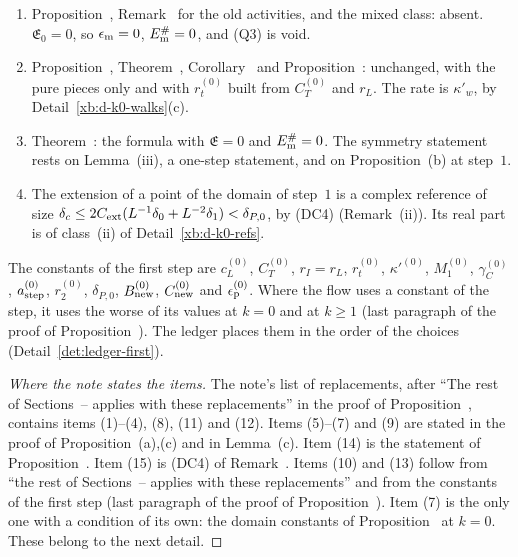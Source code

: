 \begin{detail}[Proposition~\Nref{prop:first-step}: the adaptations at $k=0$]
\begin{enumerate}[label=(\arabic*)]
\item Proposition~, Remark~ for the old activities, and the mixed class: absent. $\mathfrak E_0=0$, so $\epsilon_{\rm m}=0$, $E^\#_{\rm m}=0$, and (Q3) is void.
\item Proposition~, Theorem~, Corollary~ and Proposition~: unchanged, with the pure pieces only and with $r^{(0)}_t$ built from $C^{(0)}_T$ and $r_L$. The rate is $\kappa'_w$, by Detail~\ref{xb:d-k0-walks}(c).
\item Theorem~: the formula with $\mathfrak E=0$ and $E^\#_{\rm m}=0$. The symmetry statement rests on Lemma~(iii), a one-step statement, and on Proposition~(b) at step~$1$.
\item The extension of a point of the domain of step~$1$ is a complex reference of size $\delta_c\le2C_{\rm ext}(L^{-1}\delta_0+L^{-2}\delta_1)<\delta_{P,0}$, by (DC4) (Remark~(ii)). Its real part is of class~(ii) of Detail~\ref{xb:d-k0-refs}.
\end{enumerate}
The constants of the first step are $c^{(0)}_L$, $C^{(0)}_T$, $r_I=r_L$, $r^{(0)}_t$, $\kappa'^{(0)}$, $M_1^{(0)}$, $\gamma^{(0)}_C$, $a^{(0)}_{\rm step}$, $r_2^{(0)}$, $\delta_{P,0}$, $B^{(0)}_{\rm new}$, $C^{(0)}_{\rm new}$ and $\epsilon^{(0)}_{\rm p}$. Where the flow uses a constant of the step, it uses the worse of its values at $k=0$ and at $k\ge1$ (last paragraph of the proof of Proposition~). The ledger places them in the order of the choices (Detail~\ref{det:ledger-first}).
\end{detail}

\begin{proof}[Where the note states the items]
The note's list of replacements, after ``The rest of Sections~-- applies with these replacements'' in the proof of Proposition~, contains items (1)--(4), (8), (11) and (12). Items (5)--(7) and (9) are stated in the proof of Proposition~(a),(c) and in Lemma~(c). Item (14) is the statement of Proposition~. Item (15) is (DC4) of Remark~. Items (10) and (13) follow from ``the rest of Sections~-- applies with these replacements'' and from the constants of the first step (last paragraph of the proof of Proposition~). Item (7) is the only one with a condition of its own: the domain constants of Proposition~ at $k=0$. These belong to the next detail.
\end{proof}

